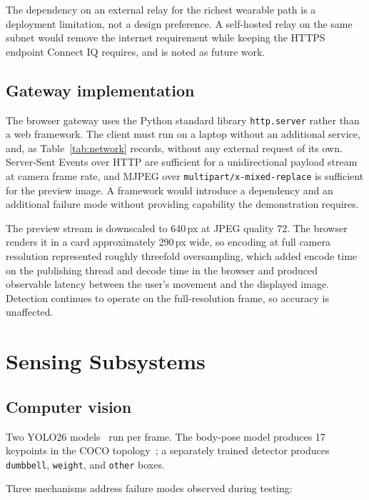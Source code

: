 \documentclass[11pt,a4paper]{article}
\newcommand{\code}[1]{\texttt{\small #1}}
\begin{document}
The dependency on an external relay for the richest wearable path is a
deployment limitation, not a design preference. A self-hosted relay on the same
subnet would remove the internet requirement while keeping the HTTPS endpoint
Connect IQ requires, and is noted as future work.

\subsection{Gateway implementation}

The browser gateway uses the Python standard library \code{http.server} rather
than a web framework. The client must run on a laptop without an additional
service, and, as Table~\ref{tab:network} records, without any external request
of its own. Server-Sent Events over HTTP are sufficient for a unidirectional
payload stream at camera frame rate, and MJPEG over
\code{multipart/x-mixed-replace} is sufficient for the preview image. A framework
would introduce a dependency and an additional failure mode without providing
capability the demonstration requires.

The preview stream is downscaled to 640\,px at JPEG quality 72. The browser
renders it in a card approximately 290\,px wide, so encoding at full camera
resolution represented roughly threefold oversampling, which added encode time on
the publishing thread and decode time in the browser and produced observable
latency between the user's movement and the displayed image. Detection continues
to operate on the full-resolution frame, so accuracy is unaffected.

\section{Sensing Subsystems}
\label{sec:sensing}

\subsection{Computer vision}

Two YOLO26 models~\cite{ultralytics} run per frame. The body-pose model produces
17 keypoints in the COCO topology~\cite{coco}; a separately trained detector
produces \code{dumbbell}, \code{weight}, and \code{other} boxes.

Three mechanisms address failure modes observed during testing:
\end{document}
